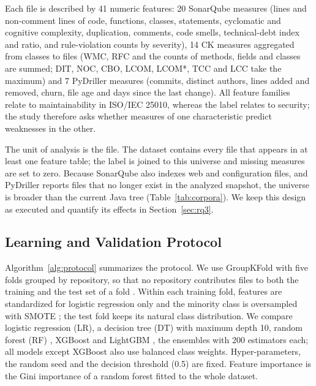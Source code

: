 \documentclass[a4paper,twoside]{article}
\begin{document}
Each file is described by 41 numeric features: 20 SonarQube measures (lines and non-comment lines of code, functions, classes, statements, cyclomatic and cognitive complexity, duplication, comments, code smells, technical-debt index and ratio, and rule-violation counts by severity), 14 CK measures aggregated from classes to files (WMC, RFC and the counts of methods, fields and classes are summed; DIT, NOC, CBO, LCOM, LCOM*, TCC and LCC take the maximum) and 7 PyDriller measures (commits, distinct authors, lines added and removed, churn, file age and days since the last change). All feature families relate to maintainability in ISO/IEC 25010, whereas the label relates to security; the study therefore asks whether measures of one characteristic predict weaknesses in the other.

The unit of analysis is the file. The dataset contains every file that appears in at least one feature table; the label is joined to this universe and missing measures are set to zero. Because SonarQube also indexes web and configuration files, and PyDriller reports files that no longer exist in the analyzed snapshot, the universe is broader than the current Java tree (Table~\ref{tab:corpora}). We keep this design as executed and quantify its effects in Section~\ref{sec:rq3}.

\subsection{Learning and Validation Protocol}

Algorithm~\ref{alg:protocol} summarizes the protocol. We use GroupKFold with five folds grouped by repository, so that no repository contributes files to both the training and the test set of a fold \cite{pedregosa2011}. Within each training fold, features are standardized for logistic regression only and the minority class is oversampled with SMOTE \cite{chawla2002}; the test fold keeps its natural class distribution. We compare logistic regression (LR), a decision tree (DT) with maximum depth 10, random forest (RF) \cite{breiman2001}, XGBoost \cite{chen2016} and LightGBM \cite{ke2017}, the ensembles with 200 estimators each; all models except XGBoost also use balanced class weights. Hyper-parameters, the random seed and the decision threshold (0.5) are fixed. Feature importance is the Gini importance of a random forest fitted to the whole dataset.
\end{document}

